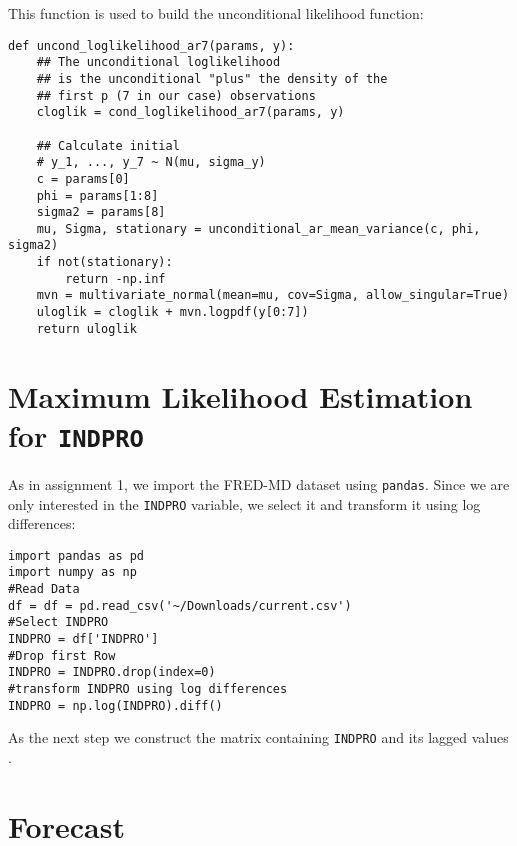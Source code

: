 \documentclass{article}
\begin{document}
This function is used to build the unconditional likelihood function:

\begin{verbatim}
def uncond_loglikelihood_ar7(params, y):
    ## The unconditional loglikelihood
    ## is the unconditional "plus" the density of the
    ## first p (7 in our case) observations
    cloglik = cond_loglikelihood_ar7(params, y)

    ## Calculate initial
    # y_1, ..., y_7 ~ N(mu, sigma_y)
    c = params[0] 
    phi = params[1:8]
    sigma2 = params[8]
    mu, Sigma, stationary = unconditional_ar_mean_variance(c, phi, sigma2)
    if not(stationary):
        return -np.inf
    mvn = multivariate_normal(mean=mu, cov=Sigma, allow_singular=True)
    uloglik = cloglik + mvn.logpdf(y[0:7])
    return uloglik
\end{verbatim}
\section{Maximum Likelihood Estimation for \texttt{INDPRO}}
As in assignment 1, we import the FRED-MD dataset using \texttt{pandas}.
Since we are only interested in the \texttt{INDPRO} variable, we select it and transform it using log differences:
\begin{verbatim}
import pandas as pd
import numpy as np
#Read Data
df = df = pd.read_csv('~/Downloads/current.csv')
#Select INDPRO
INDPRO = df['INDPRO']
#Drop first Row
INDPRO = INDPRO.drop(index=0)
#transform INDPRO using log differences
INDPRO = np.log(INDPRO).diff()
\end{verbatim}
As the next step we construct the matrix containing \texttt{INDPRO} and its lagged values .
\section{Forecast}
\end{document}
